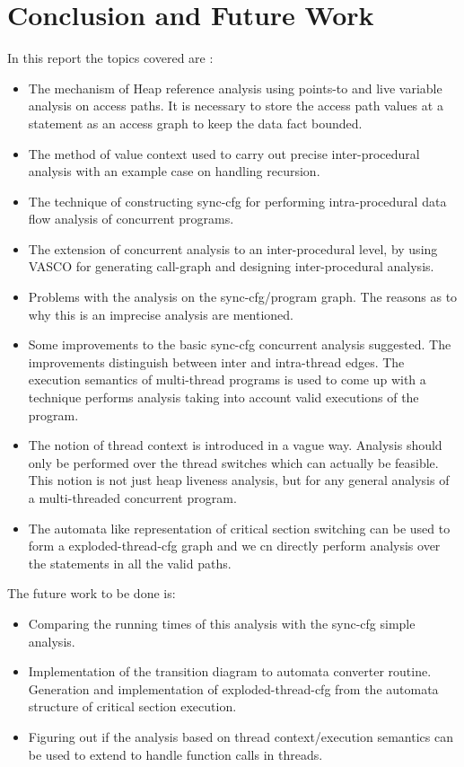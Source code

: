 \chapter{Conclusion and Future Work}

In this report the topics covered are : 

\begin{itemize}
	\item The mechanism of Heap reference analysis using points-to and live variable analysis on access paths. It is necessary to store the access path values at a statement as an access graph to keep the data fact bounded.
	\item The method of value context used to carry out precise inter-procedural analysis with an example case on handling recursion.
	\item The technique of constructing sync-cfg for performing intra-procedural data flow analysis of concurrent programs.
	\item The extension of concurrent analysis to an inter-procedural level, by using VASCO for generating call-graph and designing inter-procedural analysis.
	\item Problems with the analysis on the sync-cfg/program graph. The reasons as to why this is an imprecise analysis are mentioned.
	\item Some improvements to the basic sync-cfg concurrent analysis suggested. The improvements distinguish between inter and intra-thread edges. The execution semantics of multi-thread programs is used to come up with a technique performs analysis taking into account valid executions of the program.
	\item The notion of thread context is introduced in a vague way. Analysis should only be performed over the thread switches which can actually be feasible. This notion is not just heap liveness analysis, but for any general analysis of a multi-threaded concurrent program. 
	\item The automata like representation of critical section switching can be used to form a exploded-thread-cfg graph and we cn directly perform analysis over the statements in all the valid paths.   
\end{itemize}

The future work to be done is:

\begin{itemize}
	\item Comparing the running times of this analysis with the sync-cfg simple analysis.
	\item Implementation of the transition diagram to automata converter routine. Generation and implementation of exploded-thread-cfg from the automata structure of critical section execution.
	\item Figuring out if the analysis based on thread context/execution semantics can be used to extend to handle function calls in threads.
\end{itemize}

